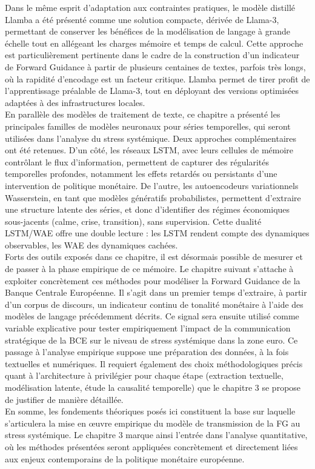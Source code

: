 Dans le même esprit d’adaptation aux contraintes pratiques, le modèle distillé Llamba a été présenté comme une solution compacte, dérivée de Llama-3, permettant de conserver les bénéfices de la modélisation de langage à grande échelle tout en allégeant les charges mémoire et temps de calcul. Cette approche est particulièrement pertinente dans le cadre de la construction d’un indicateur de Forward Guidance à partir de plusieurs centaines de textes, parfois très longs, où la rapidité d’encodage est un facteur critique. Llamba permet de tirer profit de l’apprentissage préalable de Llama-3, tout en déployant des versions optimisées adaptées à des infrastructures locales.\\

En parallèle des modèles de traitement de texte, ce chapitre a présenté les principales familles de modèles neuronaux pour séries temporelles, qui seront utilisées dans l’analyse du stress systémique. Deux approches complémentaires ont été retenues. D’un côté, les réseaux LSTM, avec leurs cellules de mémoire contrôlant le flux d’information, permettent de capturer des régularités temporelles profondes, notamment les effets retardés ou persistants d’une intervention de politique monétaire. De l’autre, les autoencodeurs variationnels Wasserstein, en tant que modèles génératifs probabilistes, permettent d’extraire une structure latente des séries, et donc d’identifier des régimes économiques sous-jacents (calme, crise, transition), sans supervision. Cette dualité LSTM/WAE offre une double lecture : les LSTM rendent compte des dynamiques observables, les WAE des dynamiques cachées.\\

Forts des outils exposés dans ce chapitre, il est désormais possible de mesurer et de passer à la phase empirique de ce mémoire. Le chapitre suivant s’attache à exploiter concrètement ces méthodes pour modéliser la Forward Guidance de la Banque Centrale Européenne. Il s’agit dans un premier temps d’extraire, à partir d’un corpus de discours, un indicateur continu de tonalité monétaire à l’aide des modèles de langage précédemment décrits. Ce signal sera ensuite utilisé comme variable explicative pour tester empiriquement l’impact de la communication stratégique de la BCE sur le niveau de stress systémique dans la zone euro. Ce passage à l’analyse empirique suppose une préparation des données, à la fois textuelles et numériques. Il requiert également des choix méthodologiques précis quant à l’architecture à privilégier pour chaque étape (extraction textuelle, modélisation latente, étude la causalité temporelle) que le chapitre 3 se propose de justifier de manière détaillée.\\

En somme, les fondements théoriques posés ici constituent la base sur laquelle s’articulera la mise en œuvre empirique du modèle de transmission de la FG au stress systémique. Le chapitre 3 marque ainsi l’entrée dans l’analyse quantitative, où les méthodes présentées seront appliquées concrètement et directement liées aux enjeux contemporains de la politique monétaire européenne.
